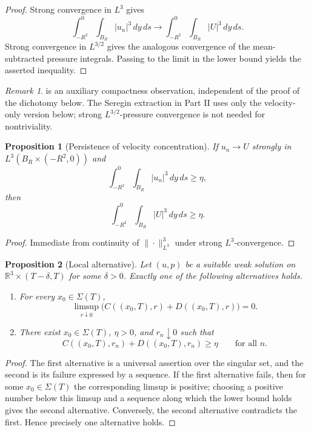 \documentclass[11pt]{amsart}
\theoremstyle{plain}
\newtheorem{proposition}[proposition]{Proposition}
\theoremstyle{definition}
\theoremstyle{remark}
\newtheorem{remark}[remark]{Remark}
\numberwithin{equation}{section}
\begin{document}
\begin{proof}
Strong convergence in \(L^3\) gives
\[
  \int_{-R^2}^{0}\int_{B_R}|u_n|^3\,dy\,ds
  \longrightarrow
  \int_{-R^2}^{0}\int_{B_R}|U|^3\,dy\,ds.
\]
Strong convergence in \(L^{3/2}\) gives the analogous convergence of the
mean-subtracted pressure integrals.  Passing to the limit in the lower bound
yields the asserted inequality.
\end{proof}

\begin{remark}
 is an auxiliary compactness observation,
independent of the proof of the dichotomy below.  The Seregin extraction in
Part II uses only the velocity-only version below; strong
\(L^{3/2}\)-pressure convergence is not needed for nontriviality.
\end{remark}

\begin{proposition}[Persistence of velocity concentration]
\label{p0:prop:velocity-persistence}
If \(u_n\to U\) strongly in \(L^3(B_R\times(-R^2,0))\) and
\[
  \int_{-R^2}^{0}\int_{B_R}|u_n|^3\,dy\,ds\ge\eta,
\]
then
\[
  \int_{-R^2}^{0}\int_{B_R}|U|^3\,dy\,ds\ge\eta.
\]
\end{proposition}

\begin{proof}
Immediate from continuity of \(\|\cdot\|_{L^3}^3\) under strong
\(L^3\)-convergence.
\end{proof}

\begin{proposition}[Local alternative]\label{p0:prop:local-alternative}
Let \((u,p)\) be a suitable weak solution on
\(\mathbb R^3\times(T-\delta,T)\) for some \(\delta>0\).  Exactly one of the
following alternatives holds.
\begin{enumerate}[label=\textup{(\roman*)}]
\item For every \(x_0\in\Sigma(T)\),
\[
  \limsup_{r\downarrow0}
  \bigl(C((x_0,T),r)+D((x_0,T),r)\bigr)=0.
\]
\item There exist \(x_0\in\Sigma(T)\), \(\eta>0\), and \(r_n\downarrow0\) such
that
\[
  C((x_0,T),r_n)+D((x_0,T),r_n)\ge\eta
  \qquad\text{for all }n.
\]
\end{enumerate}
\end{proposition}

\begin{proof}
The first alternative is a universal assertion over the singular set, and the
second is its failure expressed by a sequence.  If the first alternative fails,
then for some \(x_0\in\Sigma(T)\) the corresponding limsup is positive;
choosing a positive number below this limsup and a sequence along which the
lower bound holds gives the second alternative.  Conversely, the second
alternative contradicts the first.  Hence precisely one alternative holds.
\end{proof}
\end{document}
